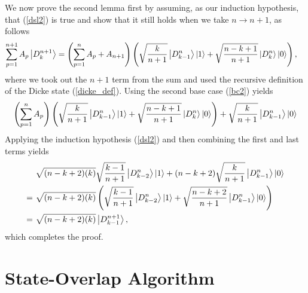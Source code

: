 \documentclass[Dual]{msu-thesis}
\begin{document}
\begin{appendices}
We now prove the second lemma first by assuming, as our induction hypothesis, that (\ref{dsl2}) is true and show that it still holds when we take $n\to n+1$, as follows
\begin{align}
\sum_{p=1}^{n+1}A_p\ket{D^{n+1}_k}
&=
\left(\sum_{p=1}^{n}A_p + A_{n+1}\right)\left(\sqrt{\frac{k}{n+1}}\ket{D^{n}_{k-1}}\ket{1}+\sqrt{\frac{n-k+1}{n+1}}\ket{D^{n}_k}\ket{0}\right),
\end{align}
where we took out the $n+1$ term from the sum and used the recursive definition of the Dicke state (\ref{dicke_def}).
Using the second base case (\ref{bc2}) yields
\begin{align}
\left(\sum_{p=1}^{n}A_p\right)\left(\sqrt{\frac{k}{n+1}}\ket{D^{n}_{k-1}}\ket{1}+\sqrt{\frac{n-k+1}{n+1}}\ket{D^{n}_k}\ket{0}\right)
+
\sqrt{\frac{k}{n+1}}\ket{D^{n}_{k-1}}\ket{0}
\end{align}
Applying the induction hypothesis (\ref{dsl2}) and then combining the first and last terms yields 
\begin{align}
&
\sqrt{(n-k+2)(k)}\sqrt{\frac{k-1}{n+1}}\ket{D^{n}_{k-2}}\ket{1}
+
(n-k+2)\sqrt{\frac{k}{n+1}}\ket{D^{n}_{k-1}}\ket{0}
\\
= \ &
\sqrt{(n-k+2)(k)}
\left(
\sqrt{\frac{k-1}{n+1}}
\ket{D^{n}_{k-2}}
\ket{1}
+
\sqrt{\frac{n-k+2}{n+1}}
\ket{D^{n}_{k-1}}
\ket{0}
\right)
\\
= \ &
\sqrt{(n-k+2)(k)}\ket{D^{n+1}_{k-1}},
\end{align}
which completes the proof.

\chapter{State-Overlap Algorithm}
\label{appendix:state_overlap_algorithm}


\end{appendices}
\end{document}
